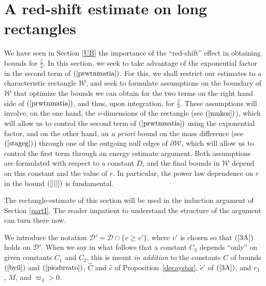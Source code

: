 \documentclass{article}
\newcommand{\zn}{\frac{\zeta}{\nu}}
\begin{document}
\section{A red-shift estimate on long rectangles}
\label{rssection}
We have seen in Section \ref{UB} the importance of the ``red-shift''
effect in obtaining bounds for $\zn$.
In this section, we seek to take advantage of
the exponential factor in the second
term of $(\ref{prwtnmatia})$. 
For this, we shall restrict our 
estimates to a characteristic
rectangle $\mathcal{W}$, 
and seek to formulate assumptions on the boundary of $\mathcal{W}$
that optimize the bounds we can obtain for the two terms
on the right hand side of $(\ref{prwtnmatia})$, and thus, upon integration,
for $\zn$.
These assumptions will involve, on the one hand, the $v$-dimensions of the rectangle
(see $(\ref{mnkos})$),
which will allow us to control the second term of $(\ref{prwtnmatia})$ using
the exponential factor, and on the other hand, an \emph{a priori} bound
on the mass difference (see $(\ref{stageg})$) 
through one of the outgoing null edges of $\partial\mathcal{W}$,
which will allow us to control the first term through an energy estimate argument. 
Both assumptions are formulated with
respect to a constant $D$, and the final bounds in $\mathcal{W}$
depend on this constant
and the value of $r$. In particular, the power law dependence on $r$
in the bound $(\ref{|||})$ is fundamental. 

The rectangle-estimate of this section will be used in the induction
argument of Section \ref{partI}. 
The reader impatient to understand the structure of the argument
can turn there now.




We introduce the notation $\mathcal{D}'=\mathcal{D}\cap\{v\ge v'\}$,
where $v'$ is chosen so that $(\ref{3A})$ holds on $\mathcal{D}'$.
When we say in what follows that a constant $C_3$ depends ``only'' on 
given constants $C_1$ and $C_2$,
this is meant \emph{in addition} to the constants $C$ of bounds $(\ref{byil})$ 
and $(\ref{pioduvato})$,
$\hat{C}$ and $\hat{c}$ of Proposition~\ref{decaystor}, $\tilde{c}'$ of $(\ref{3A})$, and
$r_3$, $M$, and $\varpi_3>0$. 
\end{document}
